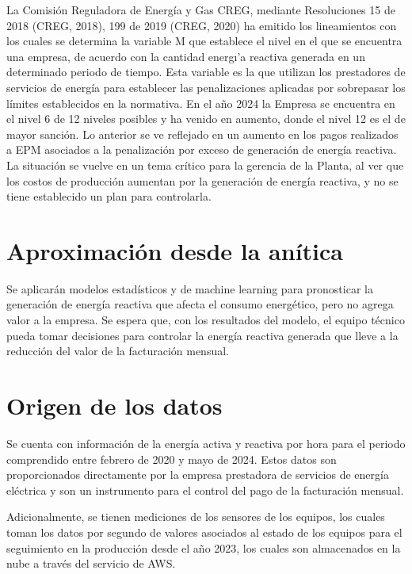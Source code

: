 La Comisi\'on Reguladora de Energ\'ia y Gas CREG, mediante Resoluciones 15 de 2018 (CREG, 2018), 199 de 2019 (CREG, 2020) ha emitido los lineamientos con los cuales se determina la variable M 
que establece el nivel en el que se encuentra una empresa, de acuerdo con la cantidad energ\i'a reactiva generada en un determinado periodo de tiempo.
Esta variable es la que utilizan los prestadores de servicios de energ\'ia para establecer las penalizaciones aplicadas por sobrepasar los l\'imites 
establecidos en la normativa. 
En el a\~no 2024 la Empresa se encuentra en el nivel 6 de 12 niveles posibles y ha venido en aumento, donde el nivel 12 es el de mayor sanci\'on. 
Lo anterior se ve reflejado en un aumento en los pagos realizados a EPM asociados a la penalizaci\'on por exceso de generaci\'on de energ\'ia reactiva.
La situaci\'on se vuelve en un tema cr\'itico para la gerencia de la Planta, al ver que los costos de producci\'on aumentan por la generaci\'on de energ\'ia reactiva, y no se tiene establecido un plan para controlarla.


\section{Aproximaci\'on desde la an\'itica}
Se aplicar\'an modelos estad\'isticos y de machine learning para pronosticar la generaci\'on de energ\'ia 
reactiva que afecta el consumo energ\'etico, pero no agrega valor a la empresa. 
Se espera que, con los resultados del modelo, el equipo t\'ecnico pueda tomar decisiones 
para controlar la energ\'ia reactiva generada que lleve a la reducci\'on del valor de la 
facturaci\'on mensual.


\section{Origen de los datos}
Se cuenta con informaci\'on de la energ\'ia activa y reactiva por hora para el periodo comprendido 
entre febrero de 2020 y mayo de 2024. Estos datos son proporcionados directamente por la 
empresa prestadora de servicios de energ\'ia el\'ectrica y son un instrumento para el control del pago de la facturaci\'on 
mensual. 

Adicionalmente, se tienen mediciones de los sensores de los equipos, los cuales toman 
los datos por segundo de valores asociados al estado de los equipos para el seguimiento 
en la producci\'on desde el a\~no 2023, los cuales son almacenados en la nube a trav\'es 
del servicio de AWS.

